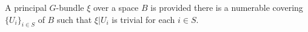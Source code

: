 A principal $G$-bundle $\xi$ over a space $B$ is  provided there is a numerable covering $\{U_i\}_{i \in S}$ of $B$ such that $\xi|U_i$ is trivial for each $i \in S$.
